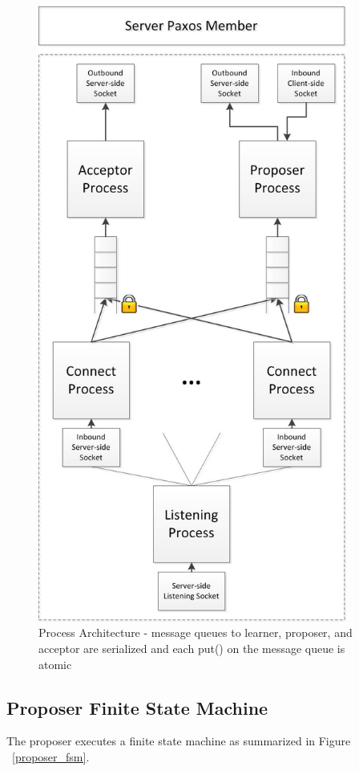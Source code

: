 \documentclass{article}
\begin{document}
\begin{figure}
\centering
\includegraphics[width=4in]{paxos_member_architecture.jpg}
\caption{Process Architecture - message queues to learner, proposer, and acceptor are serialized and each put() on the message queue is atomic}
\label{paxos_member}
\end{figure}

\subsection{Proposer Finite State Machine}

The proposer executes a finite state machine as summarized in Figure ~\ref{proposer_fsm}.
\end{document}
